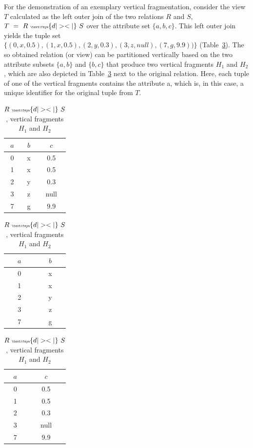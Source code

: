 \begin{exmp}
For the demonstration of an exemplary vertical fragmentation, consider the view $T$ calculated as the left outer join of the two relations $R$ and $S$, 
$T~=~R~{\tiny \textifsym{d|><|}}~S$ over the attribute set $\{a,b,c\}$. 
This left outer join yields the tuple set $\{(0,x,0.5), (1,x,0.5), (2,y,0.3), (3,z,null), (7,g,9.9))\}$ (Table~\ref{tab:join_vert_frag}). The so obtained
relation (or view) can be partitioned vertically based on the two attribute subsets $\{a,b\}$ and $\{b,c\}$ that produce two vertical fragments $H_1$ and 
$H_2$, which are also depicted in Table~\ref{tab:join_vert_frag} next to the original relation. Here, each tuple of one of the vertical fragments contains the
attribute a, which is, in this case, a unique identifier for the original tuple from $T$.

\begin{table}[h]
    \centering
    \begin{tabular}{c|c|c}
        $a$ & $b$ & $c$ \\
        \hline
        0 & x & 0.5 \\
        1 & x & 0.5 \\
        2 & y & 0.3 \\
        3 & z & null \\
        7 & g & 9.9 \\
    \end{tabular}
    \hspace{20pt}
    \begin{tabular}{c|c}
        $a$ & $b$ \\
        \hline
        0 & x \\
        1 & x \\
        2 & y \\
        3 & z \\
        7 & g \\
    \end{tabular}
    \hspace{5pt}
    \begin{tabular}{c|c}
        $a$ & $c$ \\
        \hline
        0 & 0.5 \\
        1 & 0.5 \\
        2 & 0.3 \\
        3 & null \\
        7 & 9.9 \\
    \end{tabular}
    \caption{$R~{\tiny \textifsym{d|><|}}~S$, vertical fragments $H_1$ and $H_2$}
    \label{tab:join_vert_frag}
\end{table}

\end{exmp}



